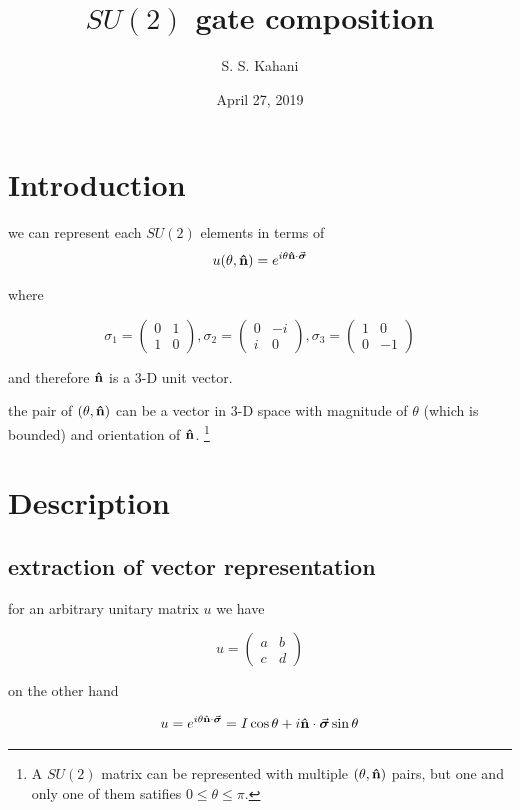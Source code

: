 \documentclass[11pt]{article}
\title{$SU(2)$ gate composition}
\author{S. S. Kahani}
\date{April 27, 2019}
\begin{document}
\maketitle

\section{Introduction}
we can represent each $SU(2)$ elements in terms of \cite{hamada}
\begin{equation}
 u(\theta, \vu{n}) = e^{i\theta \vu{n} \cdot \va*{\sigma}}
\end{equation}

where 

\[ \sigma_1 = \begin{pmatrix} 0 & 1 \\ 1 & 0 \end{pmatrix}, \sigma_2 = \begin{pmatrix} 0 & -i \\ i & 0 \end{pmatrix}, \sigma_3 = \begin{pmatrix} 1 & 0 \\ 0 & -1 \end{pmatrix} \]

and therefore $\vu{n}$ is a 3-D unit vector.

the pair of $(\theta, \vu{n})$ can be a vector in 3-D space with magnitude of $\theta$ (which is bounded) and orientation of $\vu{n}$.%
%
\footnote{A $SU(2)$ matrix can be represented with multiple $(\theta, \vu{n})$ pairs, but one and only one of them satifies $0 \le \theta \le \pi$.}

\section{Description}

\subsection{extraction of vector representation}
for an arbitrary unitary matrix $u$ we have

\[ u = \begin{pmatrix} a & b \\ c & d \end{pmatrix} \]
 
on the other hand
 
\[ u = e^{i\theta \vu{n} \cdot \va*{\sigma}} = I \cos\theta + i \vu{n} \cdot \va*{\sigma} \sin\theta \]
\end{document}
